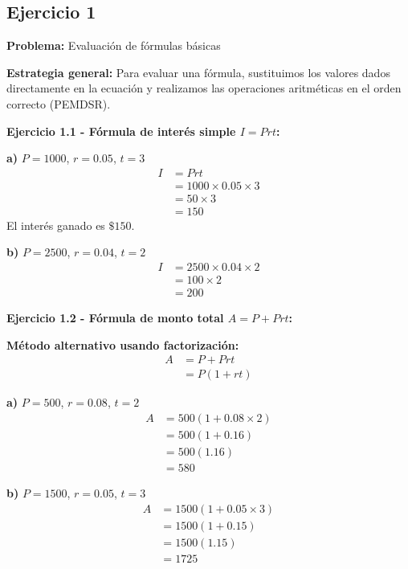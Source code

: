
\subsection*{Ejercicio 1}

\textbf{Problema:} Evaluación de fórmulas básicas

\textbf{Estrategia general:} Para evaluar una fórmula, sustituimos los valores dados directamente en la ecuación y realizamos las operaciones aritméticas en el orden correcto (PEMDSR).

\textbf{Ejercicio 1.1 - Fórmula de interés simple $I = Prt$:}

\textbf{a)} $P = 1000$, $r = 0.05$, $t = 3$
\begin{align}
I &= Prt\\
&= 1000 \times 0.05 \times 3\\
&= 50 \times 3\\
&= 150
\end{align}
El interés ganado es $\$150$.

\textbf{b)} $P = 2500$, $r = 0.04$, $t = 2$
\begin{align}
I &= 2500 \times 0.04 \times 2\\
&= 100 \times 2\\
&= 200
\end{align}

\textbf{Ejercicio 1.2 - Fórmula de monto total $A = P + Prt$:}

\textbf{Método alternativo usando factorización:}
\begin{align}
A &= P + Prt\\
&= P(1 + rt)
\end{align}

\textbf{a)} $P = 500$, $r = 0.08$, $t = 2$
\begin{align}
A &= 500(1 + 0.08 \times 2)\\
&= 500(1 + 0.16)\\
&= 500(1.16)\\
&= 580
\end{align}

\textbf{b)} $P = 1500$, $r = 0.05$, $t = 3$
\begin{align}
A &= 1500(1 + 0.05 \times 3)\\
&= 1500(1 + 0.15)\\
&= 1500(1.15)\\
&= 1725
\end{align}

